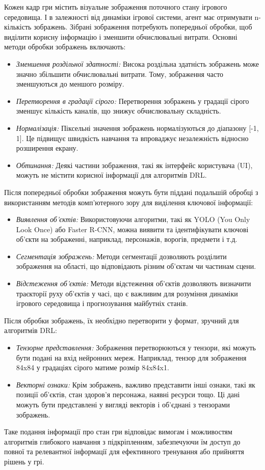 Кожен кадр гри містить візуальне зображення поточного стану ігрового середовища. 
І в залежності від динаміки ігрової системи, агент має отримувати n-кількість зображень.
 Зібрані зображення потребують попередньої обробки, щоб виділити корисну інформацію 
 і зменшити обчислювальні витрати. Основні методи обробки зображень включають:
 \begin{itemize}
  \item \emph{Зменшення роздільної здатності:} Висока роздільна здатність зображень 
  може значно збільшити обчислювальні витрати. Тому, зображення часто 
  зменшуються до меншого розміру.
  \item \emph{Перетворення в градації сірого:} Перетворення зображень у градації 
  сірого зменшує кількість каналів, що знижує обчислювальну 
  складність.
  \item \emph{Нормалізація:} Піксельні значення зображень нормалізуються до діапазону 
  [-1, 1]. Це підвищує швидкість навчання та впроваджує незалежність відносно розширення екрану.
  \item \emph{Обтинання:} Деякі частини зображення, такі як інтерфейс користувача 
  (UI), можуть не містити корисної інформації для алгоритмів DRL.
  \end{itemize}
  Після попередньої обробки зображення можуть бути піддані подальшій обробці з 
  використанням методів комп'ютерного зору для виділення ключової інформації:
  \begin{itemize}
    \item \emph{Виявлення об'єктів:} Використовуючи алгоритми, такі як YOLO 
    (You Only Look Once) або Faster R-CNN, можна виявити та ідентифікувати ключові 
    об'єкти на зображенні, наприклад, персонажів, ворогів, предмети і т.д.
    \item \emph{Сегментація зображень:} Методи сегментації дозволяють розділити 
    зображення на області, що відповідають різним об'єктам чи частинам сцени.
\item \emph{Відстеження об'єктів:} Методи відстеження об'єктів дозволяють виз\-начити 
траєкторії руху об'єктів у часі, що є важливим для розуміння динаміки ігрового 
середовища і прогнозування майбутніх станів.
\end{itemize}

Після обробки зображень, їх необхідно перетворити у формат, зручний для алгоритмів DRL:
\begin{itemize}
\item \emph{Тензорне представлення:} Зображення перетворюються у тензори, 
які можуть бути подані на вхід нейронних мереж. Наприклад, тензор для зображення 84x84 
у градаціях сірого матиме розмір 84x84x1.
\item \emph{Векторні ознаки:} Крім зображень, важливо представити інші ознаки, такі 
як позиції об'єктів, стан здоров'я персонажа, наявні ресурси тощо. Ці дані можуть бути
 представлені у вигляді векторів і об'єднані з тензорами зображень.
\end{itemize}
Таке подання інформації про стан гри відповідає вимогам і можливостям алгоритмів 
глибокого навчання з підкріпленням, забезпечуючи їм доступ до повної та релевантної 
інформації для ефективного тренування або прийнят\-тя рішень у грі.
